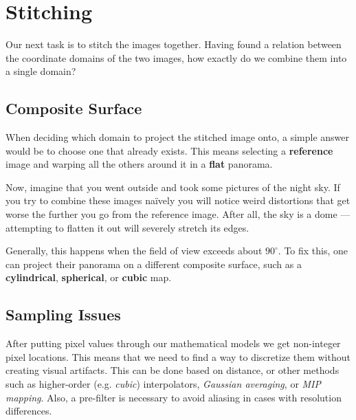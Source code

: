 \documentclass{article}
\begin{document}
\section{Stitching}
Our next task is to stitch the images together.
Having found a relation between the coordinate domains of the two images, how exactly do we combine them into a single domain?

\subsection{Composite Surface}
When deciding which domain to project the stitched image onto, a simple answer would be to choose one that already exists.
This means selecting a \textbf{reference} image and warping all the others around it in a \textbf{flat} panorama.

Now, imagine that you went outside and took some pictures of the night sky.
If you try to combine these images naïvely you will notice weird distortions that get worse the further you go from the reference image.
After all, the sky is a dome — attempting to flatten it out will severely stretch its edges.

Generally, this happens when the field of view exceeds about $90^\circ$. 
To fix this, one can project their panorama on a different composite surface, such as a \textbf{cylindrical}, \textbf{spherical}, or \textbf{cubic} map.

\subsection{Sampling Issues}
After putting pixel values through our mathematical models we get non-integer pixel locations.
This means that we need to find a way to discretize them without creating visual artifacts.
This can be done based on distance, or other methods such as higher-order (e.g. \textit{cubic}) interpolators, \textit{Gaussian averaging}, or \textit{MIP mapping}.
Also, a pre-filter is necessary to avoid aliasing in cases with resolution differences.
\end{document}
